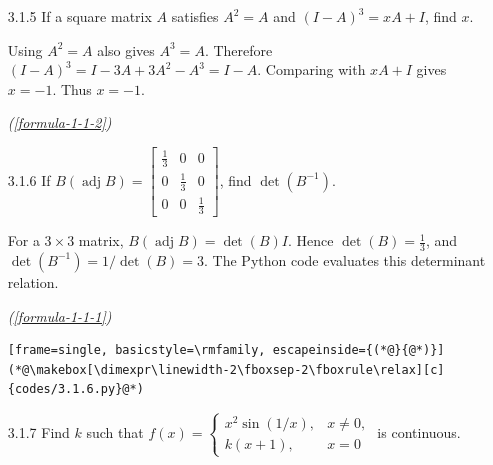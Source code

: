 \begin{enumerate}[label={},font=\normalfont,leftmargin=1.15cm,labelwidth=1.0cm,labelsep=0.15cm,itemindent=0pt,listparindent=0pt,itemsep=\baselineskip,parsep=0pt,topsep=0pt]
The left matrix has order $3\times1$ and the product has order $3\times3$. Hence $A$ must have one row and three columns: $\boxed{1\times3}$, option \textbf{b)}. The C program checks all four proposed orders against matrix multiplication rules.
\par\noindent\hfill\mbox{\textit{(\ref{formula-1-1-1})}}\par\begin{lstlisting}[frame=single, basicstyle=\rmfamily, escapeinside={(*@}{@*)}]
(*@\makebox[\dimexpr\linewidth-2\fboxsep-2\fboxrule\relax][c]{codes/3.1.4.c}@*)
\end{lstlisting}

\item[3.1.5] If a square matrix $A$ satisfies $A^2=A$ and $(I-A)^3=xA+I$, find $x$.

\vspace{0.6em}\par\solution


Using $A^2=A$ also gives $A^3=A$. Therefore $(I-A)^3=I-3A+3A^2-A^3=I-A$. Comparing with $xA+I$ gives $x=-1$. Thus $\boxed{x=-1}$.\par\noindent\hfill\mbox{\textit{(\ref{formula-1-1-2})}}\par

\item[3.1.6] If $B(\operatorname{adj}B)=\begin{bmatrix}\frac13&0&0\\0&\frac13&0\\0&0&\frac13\end{bmatrix}$, find $\det(B^{-1})$.

\vspace{0.6em}\par\solution


For a $3\times3$ matrix, $B(\operatorname{adj}B)=\det(B)I$. Hence $\det(B)=\frac13$, and $\det(B^{-1})=1/\det(B)=\boxed{3}$. The Python code evaluates this determinant relation.
\par\noindent\hfill\mbox{\textit{(\ref{formula-1-1-1})}}\par\begin{lstlisting}[frame=single, basicstyle=\rmfamily, escapeinside={(*@}{@*)}]
(*@\makebox[\dimexpr\linewidth-2\fboxsep-2\fboxrule\relax][c]{codes/3.1.6.py}@*)
\end{lstlisting}

\item[3.1.7] Find $k$ such that $f(x)=\begin{cases}x^2\sin(1/x),&x\ne0,\\k(x+1),&x=0\end{cases}$ is continuous.


\end{enumerate}
